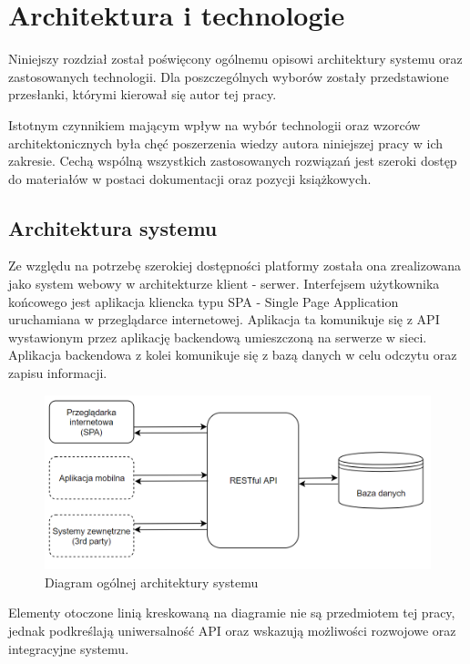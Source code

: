 \chapter{Architektura i technologie}

Niniejszy rozdział został poświęcony ogólnemu opisowi architektury systemu oraz zastosowanych technologii. Dla poszczególnych wyborów zostały przedstawione przesłanki, którymi kierował się autor tej pracy. 

Istotnym czynnikiem mającym wpływ na wybór technologii oraz wzorców architektonicznych była chęć poszerzenia wiedzy autora niniejszej pracy w ich zakresie. Cechą wspólną wszystkich zastosowanych rozwiązań jest szeroki dostęp do materiałów w postaci dokumentacji oraz pozycji książkowych. 

\section{Architektura systemu}

Ze względu na potrzebę szerokiej dostępności platformy została ona zrealizowana jako system webowy w architekturze klient - serwer. Interfejsem użytkownika końcowego jest aplikacja kliencka typu SPA - Single Page Application uruchamiana w przeglądarce internetowej. Aplikacja ta komunikuje się z API wystawionym przez aplikację backendową umieszczoną na serwerze w sieci.  Aplikacja backendowa z kolei komunikuje się z bazą danych w celu odczytu oraz zapisu informacji. 

\begin{figure}[ht]
\centering
\includegraphics[width=0.8\linewidth]{05-architektura-i-technologie/rys/ogolna-architektura.PNG}
\caption{Diagram ogólnej architektury systemu}
\label{fig:diagram-og-architekt}
\end{figure}

Elementy otoczone linią kreskowaną na diagramie nie są przedmiotem tej pracy, jednak podkreślają uniwersalność API oraz wskazują możliwości rozwojowe oraz integracyjne systemu.

